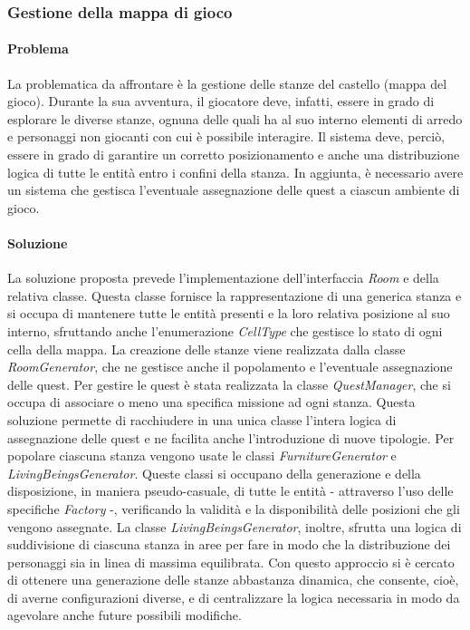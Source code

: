\documentclass[a4paper,12pt]{report}
\begin{document}
\subsubsection{Gestione della mappa di gioco}
\paragraph{Problema} La problematica da affrontare è la gestione delle stanze del castello (mappa del gioco).
Durante la sua avventura, il giocatore deve, infatti, essere in grado di esplorare le diverse stanze, ognuna delle quali 
ha al suo interno elementi di arredo e personaggi non giocanti con cui è possibile interagire.
Il sistema deve, perciò, essere in grado di garantire un corretto posizionamento e anche una distribuzione logica di tutte le entità entro i confini della stanza.\newline
In aggiunta, è necessario avere un sistema che gestisca l'eventuale assegnazione delle quest a ciascun ambiente di gioco.
\paragraph{Soluzione} La soluzione proposta prevede l'implementazione dell'interfaccia \textit{Room} e della relativa classe.
Questa classe fornisce la rappresentazione di una generica stanza e si occupa di mantenere tutte le entità presenti e la loro relativa posizione al suo interno, sfruttando anche
l'enumerazione \textit{CellType} che gestisce lo stato di ogni cella della mappa.\newline
La creazione delle stanze viene realizzata dalla classe \textit{RoomGenerator}, che ne gestisce anche il popolamento e l'eventuale assegnazione delle quest.\newline
Per gestire le quest è stata realizzata la classe \textit{QuestManager}, che si occupa di associare o meno una specifica missione ad ogni stanza.
Questa soluzione permette di racchiudere in una unica classe l'intera logica di assegnazione delle quest e ne facilita anche l'introduzione di nuove tipologie.\newline
Per popolare ciascuna stanza vengono usate le classi \textit{FurnitureGenerator} e \textit{LivingBeingsGenerator}.
Queste classi si occupano della generazione e della disposizione, in maniera pseudo-casuale, di tutte le entità - attraverso l'uso delle specifiche \textit{Factory} -, verificando la validità e la disponibilità
delle posizioni che gli vengono assegnate. La classe \textit{LivingBeingsGenerator}, inoltre, sfrutta una logica di suddivisione di ciascuna stanza in aree per fare in modo che la 
distribuzione dei personaggi sia in linea di massima equilibrata.
Con questo approccio si è cercato di ottenere una generazione delle stanze abbastanza dinamica, che consente, cioè, di averne configurazioni diverse, 
e di centralizzare la logica necessaria in modo da agevolare anche future possibili modifiche.\newline
\end{document}
